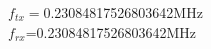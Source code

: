 \documentclass[preview]{standalone}
\begin{document}
\begin{center}
$f_{tx}=$0.23084817526803642MHz\\$f_{rx}$=0.23084817526803642MHz
\end{center}
\end{document}
